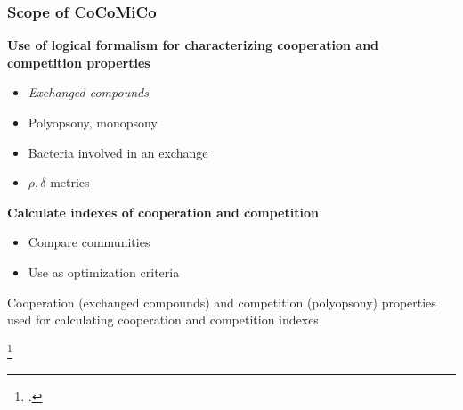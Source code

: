 \documentclass[8pt,usenames,dvipsnames]{beamer}
\begin{document}
\begin{frame}
\frametitle{Scope of CoCoMiCo}

\textbf{Use of logical formalism for characterizing cooperation and competition properties}
\begin{itemize}
\item \textit{Exchanged compounds}
\item Polyopsony, monopsony
\item Bacteria involved in an exchange
\item $\rho, \delta $ metrics  
\end{itemize}

\vspace{1cm}
\textbf{ Calculate indexes of cooperation and competition}
\begin{itemize}
\item Compare communities
\item Use as optimization criteria 
\end{itemize}

\begin{alertblock}{}
Cooperation (exchanged compounds) and competition (polyopsony) properties used for calculating cooperation and competition indexes
\end{alertblock}

\footcite{Frioux2018}
\end{frame}
\end{document}
